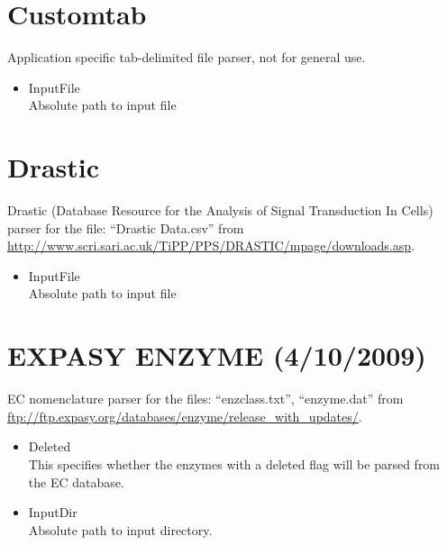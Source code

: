     
\section{Customtab}
Application specific tab-delimited file parser, not for general use.
\begin{itemize}
  \item{InputFile}\\
  Absolute path to input file
\end{itemize}
    
    
\section{Drastic}
Drastic (Database Resource for the Analysis of Signal Transduction In Cells) parser for the file: ``Drastic Data.csv''
from \url{http://www.scri.sari.ac.uk/TiPP/PPS/DRASTIC/mpage/downloads.asp}.
\begin{itemize}
  \item{InputFile}\\
  Absolute path to input file
\end{itemize}
    
    
\section{EXPASY ENZYME (4/10/2009)}
EC nomenclature parser for the files: ``enzclass.txt'', ``enzyme.dat''
from \url{ftp://ftp.expasy.org/databases/enzyme/release_with_updates/}.
\begin{itemize}
  \item{Deleted}\\
  This specifies whether the enzymes with a deleted flag will be parsed from the EC database.
  \item{InputDir}\\
  Absolute path to input directory.
\end{itemize}
    
    
